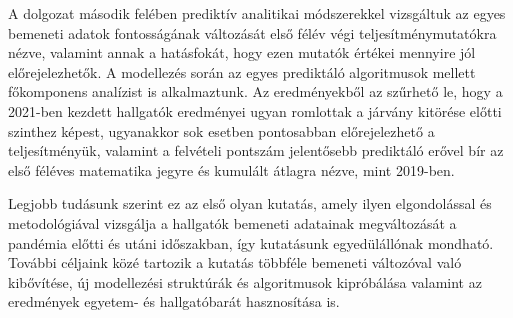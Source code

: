 \documentclass[12pt]{article}
\begin{document}
A dolgozat második felében prediktív analitikai módszerekkel vizsgáltuk az egyes bemeneti adatok fontosságának változását első félév végi teljesítménymutatókra nézve, valamint annak a hatásfokát, hogy ezen mutatók értékei mennyire jól előrejelezhetők. A modellezés során az egyes prediktáló algoritmusok mellett főkomponens analízist is alkalmaztunk. Az eredményekből az szűrhető le, hogy a 2021-ben kezdett hallgatók eredményei ugyan romlottak a járvány kitörése előtti szinthez képest, ugyanakkor sok esetben pontosabban előrejelezhető a teljesítményük, valamint a felvételi pontszám jelentősebb prediktáló erővel bír az első féléves matematika jegyre és kumulált átlagra nézve, mint 2019-ben.

Legjobb tudásunk szerint ez az első olyan kutatás, amely ilyen elgondolással és metodológiával vizsgálja a hallgatók bemeneti adatainak megváltozását a pandémia előtti és utáni időszakban, így kutatásunk egyedülállónak mondható. További céljaink közé tartozik a kutatás többféle bemeneti változóval való kibővítése, új modellezési struktúrák és algoritmusok kipróbálása valamint az eredmények egyetem- és hallgatóbarát hasznosítása is.
\end{document}
